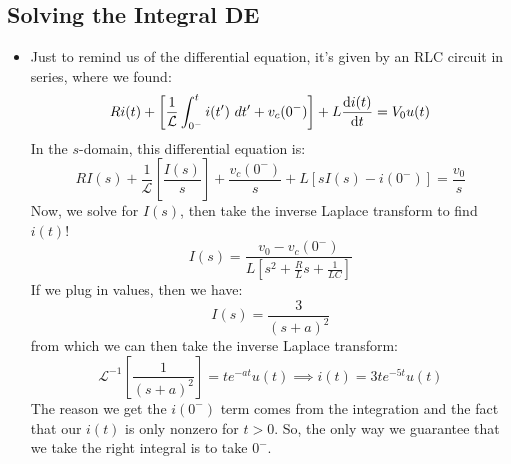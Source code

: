 \subsection{Solving the Integral DE}
\begin{itemize}
	\item Just to remind us of the differential equation, it's given by an RLC circuit in series, where we found:
		\[
		R i(t) + \left[ \frac{1}{\mathcal L} \int_{0^{-}}^{t} i(t') \ d t' + v_c(0^{-}) \right] 
		+ L \dv{i(t)}{t} = V_0u(t)
		\] 
		In the \( s \)-domain, this differential equation is:
		\[
			R I(s) + \frac{1}{\mathcal L}\left[ \frac{I(s)}{s}\right] + \frac{v_c(0^{-})}{s} + L[s I(s) - i(0^{-})]
			= \frac{v_0}{s}
		\] 
		Now, we solve for \( I(s) \), then take the inverse Laplace transform to find \( i(t) \)!
		\[
		I(s) = \frac{v_0 - v_c(0^{-})}{L \left[ s^2 + \frac{R}{L}s + \frac{1}{LC} \right] }
		\] 
		If we plug in values, then we have:
		\[
		I(s) = \frac{3}{(s + a)^2}
		\] 
		from which we can then take the inverse Laplace transform:
		\[
		\mathcal L^{-1}\left[ \frac{1}{(s + a)^2} \right] = te^{-at}u(t)
		\implies i(t) = 3te^{-5t}u(t)
		\] 
		The reason we get the \( i(0^{-}) \) term comes from the integration and the fact that our \( i(t) \) 
		is only nonzero for \( t > 0 \). So, the only way we guarantee that we take the right integral is to 
		take \( 0^{-} \). 
\end{itemize}
